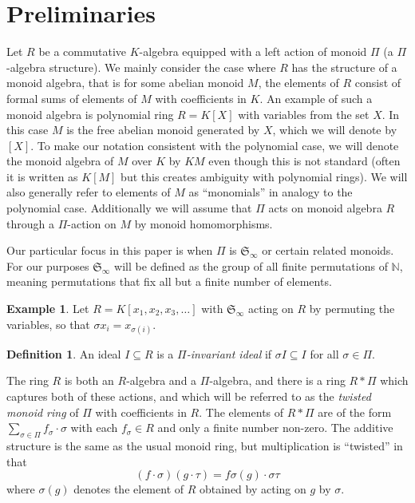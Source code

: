 \documentclass{article}
\title{}
\author{}
\theoremstyle{plain}
\theoremstyle{definition}
\newtheorem{definition}[theorem]{Definition}
\newtheorem{example}[theorem]{Example}
\numberwithin{equation}{section}
\newcommand{\B}[1]{\mathbb #1}
\newcommand{\F}[1]{\mathfrak #1}
\newcommand{\SymN}{\F S_\infty}
\newcommand{\mon}{M}
\begin{document}
\section{Preliminaries}
Let $R$ be a commutative $K$-algebra equipped with a left action of monoid $\Pi$ (a $\Pi$-algebra structure).  We mainly consider the case where $R$ has the structure of a monoid algebra, that is for some abelian monoid $\mon$, the elements of $R$ consist of formal sums of elements of $\mon$ with coefficients in $K$.  An example of such a monoid algebra is polynomial ring $R = K[X]$ with variables from the set $X$.  In this case $\mon$ is the free abelian monoid generated by $X$, which we will denote by $[X]$.  To make our notation consistent with the polynomial case, we will denote the monoid algebra of $\mon$ over $K$ by $K\mon$ even though this is not standard (often it is written as $K[\mon]$ but this creates ambiguity with polynomial rings).  We will also generally refer to elements of $\mon$ as ``monomials'' in analogy to the polynomial case.  Additionally we will assume that $\Pi$ acts on monoid algebra $R$ through a $\Pi$-action on $\mon$ by monoid homomorphisms.

Our particular focus in this paper is when $\Pi$ is $\SymN$ or certain related monoids.  For our purposes $\SymN$ will be defined as the group of all finite permutations of $\B N$, meaning permutations that fix all but a finite number of elements.

\begin{example}
 Let $R = K[x_1,x_2,x_3,\ldots]$ with $\SymN$ acting on $R$ by permuting the variables, so that $\sigma x_i = x_{\sigma(i)}$.
\end{example}

\begin{definition}
 An ideal $I \subseteq R$ is a {\em $\Pi$-invariant ideal} if $\sigma I \subseteq I$ for all $\sigma \in \Pi$.
\end{definition}

The ring $R$ is both an $R$-algebra and a $\Pi$-algebra, and there is a ring $R*\Pi$ which captures both of these actions, and which will be referred to as the {\em twisted monoid ring} of $\Pi$ with coefficients in $R$.  The elements of $R*\Pi$ are of the form $\sum_{\sigma \in \Pi} f_{\sigma}\cdot \sigma$ with each $f_\sigma \in R$ and only a finite number non-zero.  The additive structure is the same as the usual monoid ring, but multiplication is ``twisted'' in that
 \[ (f\cdot \sigma)(g \cdot \tau) = f\sigma(g) \cdot \sigma\tau \]
where $\sigma(g)$ denotes the element of $R$ obtained by acting on $g$ by $\sigma$.
\end{document}
